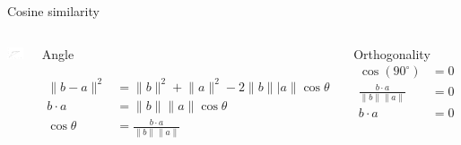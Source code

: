 \documentclass[
  10pt,
  ignorenonframetext,
  x11names, dvipsnames, bibspacing,natbib, table]{beamer}
\begin{document}
\begin{frame}{Cosine similarity}
\protect\hypertarget{cosine-similarity-3}{}
\begin{columns}
    

\begin{center}\includegraphics[width=1\linewidth]{presentationBoston_files/figure-beamer/cosine4-1} \end{center}




\footnotesize 


\begin{block}{Angle}

\begin{align*}
\lVert b - a \rVert^2 &  = \lVert  b \rVert^2 + \lVert a \rVert^2 - 
  2 \lVert b \rVert   \lvert  a \rVert  \cos \theta  \\
b \cdot a  & = \lVert b\rVert \lVert  a \rVert \cos \theta \\ 
\cos \theta & = \frac{b \cdot a}{\lVert b\rVert  \lVert  a \rVert }
\end{align*}

\end{block}


\pause 

\begin{block}{Orthogonality}
\begin{align*}
\cos ( 90^{\circ}) & = 0 \\ 
\frac{b \cdot a}{\lVert  b\rVert \lVert a \rVert} & = 0\\ 
 b \cdot a & = 0  
\end{align*}
\end{block}







\end{columns}
\end{frame}
\end{document}
